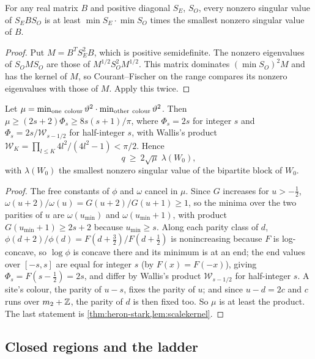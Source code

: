 \begin{lemma}\label{lem:scalekernel}
For any real matrix $B$ and positive diagonal $S_E$, $S_O$, every nonzero singular value
of $S_EBS_O$ is at least $\min S_E\cdot\min S_O$ times the smallest nonzero singular
value of $B$.
\end{lemma}

\begin{proof}
Put $M=B^TS_E^2B$, which is positive semidefinite. The nonzero eigenvalues of
$S_OMS_O$ are those of $M^{1/2}S_O^2M^{1/2}$. This matrix dominates $(\min S_O)^2M$ and
has the kernel of $M$, so Courant--Fischer on the range compares its nonzero eigenvalues
with those of $M$. Apply this twice.
\end{proof}

\begin{lemma}\label{lem:mu}
Let $\mu=\min_{\rm one\ colour}\vartheta^2\cdot\min_{\rm other\ colour}\vartheta^2$. Then
$\mu\ge(2s+2)\Phi_s\ge8s(s+1)/\pi$, where $\Phi_s=2s$ for integer $s$ and
$\Phi_s=2s/\mathcal W_{s-1/2}$ for half-integer $s$, with Wallis's product
$\mathcal W_K=\prod_{l\le K}4l^2/(4l^2-1)<\pi/2$. Hence
\[
  q\ \ge\ 2\sqrt\mu\;\lambda(W_0),
\]
with $\lambda(W_0)$ the smallest nonzero singular value of the bipartite block of $W_0$.
\end{lemma}

\begin{proof}
The free constants of $\phi$ and $\omega$ cancel in $\mu$. Since $G$ increases for
$u>-\frac12$, $\omega(u+2)/\omega(u)=G(u+2)/G(u+1)\ge1$, so the minima over the two
parities of $u$ are $\omega(u_{\min})$ and $\omega(u_{\min}+1)$, with product
$G(u_{\min}+1)\ge2s+2$ because $u_{\min}\ge s$. Along each parity class of $d$,
$\phi(d+2)/\phi(d)=F(d+\frac32)/F(d+\frac12)$ is nonincreasing because $F$ is
log-concave, so $\log\phi$ is concave there and its minimum is at an end; the end values
over $[-s,s]$ are equal for integer $s$ (by $F(x)=F(-x)$), giving $\Phi_s=F(s-\frac12)
=2s$, and differ by Wallis's product $\mathcal W_{s-1/2}$ for half-integer $s$. A
site's colour, the parity of $u-s$, fixes the parity of $u$; and since $u-d=2c$ and
$c$ runs over $m_2+\mathbb{Z}$, the parity of $d$ is then fixed too. So $\mu$ is at least the
product. The last statement is \cref{thm:heron-stark,lem:scalekernel}.
\end{proof}

\subsection{Closed regions and the ladder}\label{subsec:closed}

